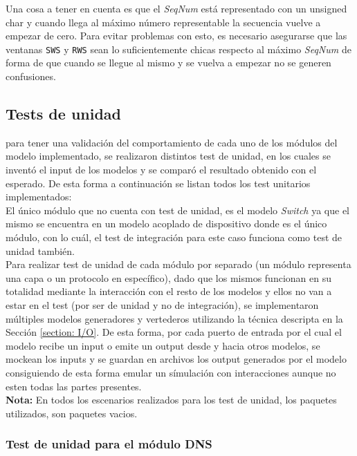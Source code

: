 \documentclass[10pt,a4paper]{article}
\begin{document}
Una cosa a tener en cuenta es que el \textit{SeqNum} está representado con un unsigned char y cuando llega al máximo número representable la secuencia vuelve a empezar de cero. Para evitar problemas con esto, es necesario asegurarse que las ventanas \texttt{SWS} y \texttt{RWS} sean lo suficientemente chicas respecto al máximo \textit{SeqNum} de forma de que cuando se llegue al mismo y se vuelva a empezar no se generen confusiones. \\

\subsection{Tests de unidad}

para tener una validación del comportamiento de cada uno de los módulos del modelo implementado, se realizaron distintos test de unidad, en los cuales se inventó el input de los modelos y se comparó el resultado obtenido con el esperado. De esta forma a continuación se listan todos los test unitarios implementados: \\

El único módulo que no cuenta con test de unidad, es el modelo \textit{Switch} ya que el mismo se encuentra en un modelo acoplado de dispositivo donde es el único módulo, con lo cuál, el test de integración para este caso funciona como test de unidad también. \\

Para realizar test de unidad de cada módulo por separado (un módulo representa una capa o un protocolo en específico), dado que los mismos funcionan en su totalidad mediante la interacción con el resto de los modelos y ellos no van a estar en el test (por ser de unidad y no de integración), se implementaron múltiples modelos generadores y vertederos utilizando la técnica descripta en la Sección \ref{section: I/O}. De esta forma, por cada puerto de entrada por el cual el modelo recibe un input o emite un output desde y hacia otros modelos, se mockean los inputs y se guardan en archivos los output generados por el modelo consiguiendo de esta forma emular un símulación con interacciones aunque no esten todas las partes presentes. \\

\textbf{Nota:} En todos los escenarios realizados para los test de unidad, los paquetes utilizados, son paquetes vacios.\\

\subsubsection{Test de unidad para el módulo DNS}
\end{document}
